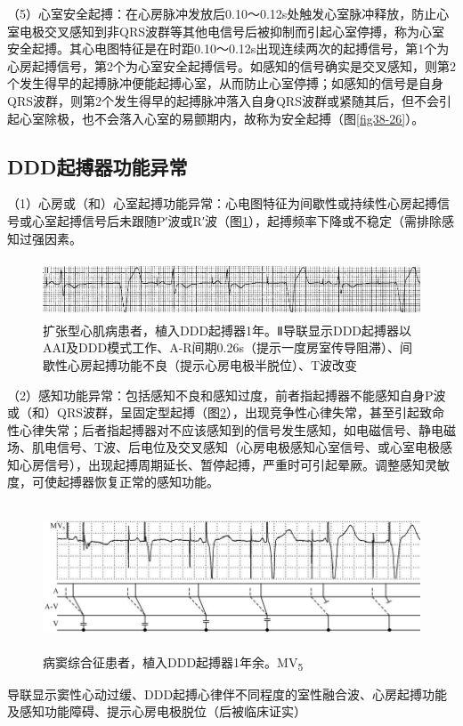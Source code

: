（5）心室安全起搏：在心房脉冲发放后0.10～0.12s处触发心室脉冲释放，防止心室电极交叉感知到非QRS波群等其他电信号后被抑制而引起心室停搏，称为心室安全起搏。其心电图特征是在时距0.10～0.12s出现连续两次的起搏信号，第1个为心房起搏信号，第2个为心室安全起搏信号。如感知的信号确实是交叉感知，则第2个发生得早的起搏脉冲便能起搏心室，从而防止心室停搏；如感知的信号是自身QRS波群，则第2个发生得早的起搏脉冲落入自身QRS波群或紧随其后，但不会引起心室除极，也不会落入心室的易颤期内，故称为安全起搏（图\ref{fig38-26}）。

\protect\hypertarget{text00045.htmlux5cux23subid498}{}{}

\subsection{DDD起搏器功能异常}

（1）心房或（和）心室起搏功能异常：心电图特征为间歇性或持续性心房起搏信号或心室起搏信号后未跟随P′波或R′波（图\ref{fig38-33}），起搏频率下降或不稳定（需排除感知过强因素。

\begin{figure}[!htbp]
 \centering
 \includegraphics[width=5.58333in,height=0.67708in]{./images/Image00636.jpg}
 \captionsetup{justification=centering}
 \caption{扩张型心肌病患者，植入DDD起搏器1年。Ⅱ导联显示DDD起搏器以AAI及DDD模式工作、A-R间期0.26s（提示一度房室传导阻滞）、间歇性心房起搏功能不良（提示心房电极半脱位）、T波改变}
 \label{fig38-33}
  \end{figure} 

（2）感知功能异常：包括感知不良和感知过度，前者指起搏器不能感知自身P波或（和）QRS波群，呈固定型起搏（图\ref{fig38-34}），出现竞争性心律失常，甚至引起致命性心律失常；后者指起搏器对不应该感知到的信号发生感知，如电磁信号、静电磁场、肌电信号、T波、后电位及交叉感知（心房电极感知心室信号、或心室电极感知心房信号），出现起搏周期延长、暂停起搏，严重时可引起晕厥。调整感知灵敏度，可使起搏器恢复正常的感知功能。

\begin{figure}[!htbp]
 \centering
 \includegraphics[width=5.80208in,height=1.70833in]{./images/Image00637.jpg}
 \captionsetup{justification=centering}
 \caption{病窦综合征患者，植入DDD起搏器1年余。MV\textsubscript{5}}
 \label{fig38-34}
  \end{figure} 
导联显示窦性心动过缓、DDD起搏心律伴不同程度的室性融合波、心房起搏功能及感知功能障碍、提示心房电极脱位（后被临床证实）

